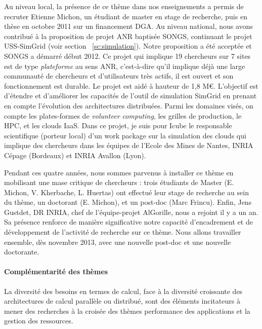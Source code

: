 \documentclass[11pt]{article}
\begin{document}
Au niveau  local, la  présence de ce  thème dans nos  enseignements a  permis de
recruter Etienne  Michon, un étudiant de  master en stage de  recherche, puis en
thèse en octobre 2011 sur un financement DGA. 
%
Au niveau national, nous avons contribué à la proposition de projet ANR baptisée
SONGS,     continuant      le     projet     USS-SimGrid      (voir     section~
\ref{sc:simulation}). Notre proposition a été  acceptée et SONGS a démarré début
2012.   Ce  projet  qui  implique  19   chercheurs  sur  7  sites  est  de  type
\emph{plateforme}  au  sens ANR,  c'est-à-dire  qu'il  implique déjà  une  large
communauté de  chercheurs et d'utilisateurs  très actifs,  il est ouvert  et son
fonctionnement  est durable.   Le projet  est aidé  à hauteur  de 1,8  M\euro{}.
L'objectif est d'étendre  et d'améliorer les capacités de  l'outil de simulation
SimGrid en  prenant en compte  l'évolution des architectures  distribuées. Parmi
les domaines visés,  on compte les plates-formes  de \emph{volunteer computing},
les grilles de production,  le HPC, et les clouds IaaS. Dans  ce projet, je suis
pour Icube le responsable scientifique (porteur  local) d'un work package sur la
simulation des  clouds qui implique des  chercheurs dans les équipes  de l'Ecole
des Mines de Nantes, INRIA Cépage (Bordeaux) et INRIA Avallon (Lyon).

Pendant  ces  quatre années,  nous  sommes  parvenus  à  installer ce  thème  en
mobilisant  une  mase  critique  de  chercheurs  :  trois  étudiants  de  Master
(E. Michon, V.  Kherbache, L.  Huertas)  ont effectué leur stage de recherche au
sein du thème,  un doctorant (E. Michon), et un  post-doc (Marc Frincu).  Enfin,
Jens Gustdet, DR INRIA, chef de l'équipe-projet AlGorille, nous a rejoint il y a
un  an.    Sa  présence  renforce   de  manière  significative   notre  capacité
d'encadrement et de développement de l'activité  de recherche sur ce thème. Nous
allons travailler ensemble, dès novembre 2013, avec une nouvelle post-doc et une
nouvelle doctorante.





\paragraph{Complémentarité des thèmes}
La diversité des besoins en termes de calcul, face à la diversité croissante des
architectures de calcul parallèle ou  distribué, sont des éléments incitateurs à
mener des recherches à la croisée  des thèmes performance des applications et la
gestion des ressources.\\
\end{document}
